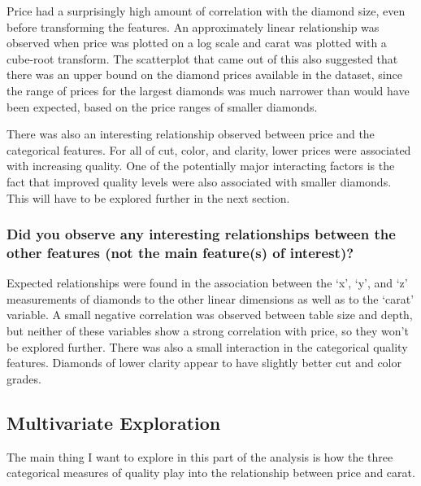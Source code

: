 \documentclass[11pt]{article}
\begin{document}
Price had a surprisingly high amount of correlation with the diamond
size, even before transforming the features. An approximately linear
relationship was observed when price was plotted on a log scale and
carat was plotted with a cube-root transform. The scatterplot that came
out of this also suggested that there was an upper bound on the diamond
prices available in the dataset, since the range of prices for the
largest diamonds was much narrower than would have been expected, based
on the price ranges of smaller diamonds.

There was also an interesting relationship observed between price and
the categorical features. For all of cut, color, and clarity, lower
prices were associated with increasing quality. One of the potentially
major interacting factors is the fact that improved quality levels were
also associated with smaller diamonds. This will have to be explored
further in the next section.

\hypertarget{did-you-observe-any-interesting-relationships-between-the-other-features-not-the-main-features-of-interest}{%
\subsubsection{Did you observe any interesting relationships between the
other features (not the main feature(s) of
interest)?}\label{did-you-observe-any-interesting-relationships-between-the-other-features-not-the-main-features-of-interest}}

Expected relationships were found in the association between the `x',
`y', and `z' measurements of diamonds to the other linear dimensions as
well as to the `carat' variable. A small negative correlation was
observed between table size and depth, but neither of these variables
show a strong correlation with price, so they won't be explored further.
There was also a small interaction in the categorical quality features.
Diamonds of lower clarity appear to have slightly better cut and color
grades.

\hypertarget{multivariate-exploration}{%
\subsection{Multivariate Exploration}\label{multivariate-exploration}}

The main thing I want to explore in this part of the analysis is how the
three categorical measures of quality play into the relationship between
price and carat.
\end{document}

